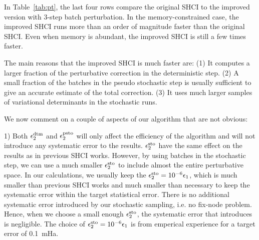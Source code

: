 \documentclass[%
preprint,
 superscriptaddress,
 amsmath,amssymb,
 aps,
]{revtex4-1}
\begin{document}
In Table~\ref{tab:pt}, the last four rows compare the original SHCI to the improved version with 3-step batch perturbation.
In the memory-constrained case, the improved SHCI runs more than an order of magnitude faster than the original SHCI.
Even when memory is abundant, the improved SHCI is still a few times faster.

The main reasons that the improved SHCI is much faster are:
(1) It computes a larger fraction of the perturbative correction in the deterministic step.
(2) A small fraction of the batches in the pseudo stochastic step is usually sufficient to give an accurate estimate of the total correction.
(3) It uses much larger samples of variational determinants in the stochastic runs.

We now comment on a couple of aspects of our algorithm that are not obvious:

{\color{blue}1) Both $\epsilon_2^{\rm dtm}$ and $\epsilon_2^{\rm psto}$ will only affect the efficiency of the algorithm and will not introduce any systematic error to the results.
$\epsilon_2^{\rm sto}$ have the same effect on the results as in previous SHCI works. However, by using batches in the stochastic step, we can use a much smaller $\epsilon_2^{\rm sto}$ to include almost the entire perturbative space. In our calculations, we usually keep the $\epsilon_2^{\rm sto}=10^{-6}\epsilon_1$, which is much smaller than previous SHCI works and much smaller than necessary to keep the systematic error within the target statistical error.
There is no additional systematic error introduced by our stochastic sampling, i.e. no fix-node problem.
Hence, when we choose a small enough $\epsilon_2^{\rm sto}$, the systematic error that introduces is negligible.
The choice of $\epsilon_2^{\rm sto}=10^{-6}\epsilon_1$ is from emperical experience for a target error of 0.1~mHa.
}
\end{document}
